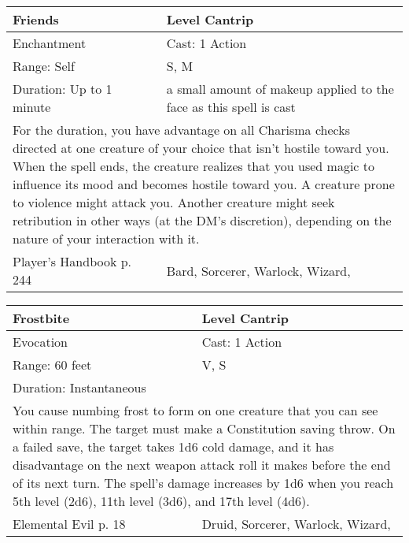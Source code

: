 \documentclass[11pt]{report}
\begin{document}
\begin{table}[H]
	\begin{tabular}{||p{6cm}|p{6cm}||}
		\hline\hline
		\bf{Friends} & Level Cantrip\\ \hline
		Enchantment & Cast: 1 Action\\ \hline
		Range: Self & S, M\\ \hline
		Duration: Up to 1 minute & a small amount of makeup applied to the face as this spell is cast\\ \hline
		\multicolumn{2}{||p{12cm}||}{For the duration, you have advantage on all Charisma checks directed at one creature of your choice that isn’t hostile toward you. When the spell ends, the creature realizes that you used magic to influence its mood and becomes hostile toward you. A creature prone to violence might attack you. Another creature might seek retribution in other ways (at the DM’s discretion), depending on the nature of your interaction with it.}\\ \hline
Player's Handbook p. 244 & Bard, Sorcerer, Warlock, Wizard, \\ \hline\hline
	\end{tabular}
\end{table}

\begin{table}[H]
	\begin{tabular}{||p{6cm}|p{6cm}||}
		\hline\hline
		\bf{Frostbite} & Level Cantrip\\ \hline
		Evocation & Cast: 1 Action\\ \hline
		Range: 60 feet & V, S\\ \hline
		Duration: Instantaneous & \\ \hline
		\multicolumn{2}{||p{12cm}||}{You cause numbing frost to form on one creature that you can see within range. The target must make a Constitution saving throw. On a failed save, the target takes 1d6 cold damage, and it has disadvantage on the next weapon attack roll it makes before the end of its next turn.
The spell’s damage increases by 1d6 when you reach 5th level (2d6), 11th level (3d6), and 17th level (4d6).}\\ \hline
Elemental Evil p. 18 & Druid, Sorcerer, Warlock, Wizard, \\ \hline\hline
	\end{tabular}
\end{table}
\end{document}
